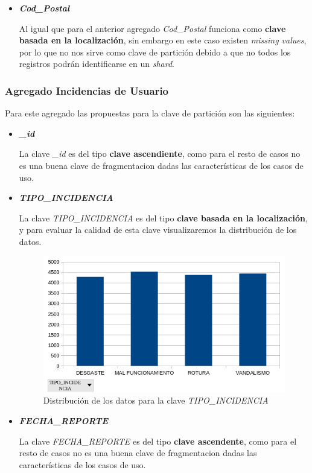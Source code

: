 \documentclass[]{article}
\begin{document}
\begin{itemize}
    \item \textbf{\textit{Cod\_Postal}}
    
    Al igual que para el anterior agregado \textit{Cod\_Postal} funciona como \textbf{clave basada en la localización}, sin embargo en este caso existen \textit{missing values}, por lo que no nos sirve como clave de partición debido a que no todos los registros podrán identificarse en un \textit{shard}.
\end{itemize}

\subsubsection{Agregado Incidencias de Usuario}
\label{subsubsec:fragmentacion_incidencia}

Para este agregado las propuestas para la clave de partición son las siguientes:

\begin{itemize}
    \item \textbf{\textit{\_id}}
    
    La clave \textit{\_id} es del tipo \textbf{clave ascendiente}, como para el resto de casos no es una buena clave de fragmentacion dadas las características de los casos de uso.

    \item \textbf{\textit{TIPO\_INCIDENCIA}}
    
    La clave \textit{TIPO\_INCIDENCIA} es del tipo \textbf{clave basada en la localización}, y para evaluar la calidad de esta clave visualizaremos la distribución de los datos.

    \begin{figure}[H]
        \includegraphics[width=0.90\linewidth]{Distribucion_Incidencias_TIPO_INCIDENCIA.png}
        \caption{Distribución de los datos para la clave \textit{TIPO\_INCIDENCIA}}
    \end{figure}

    \item \textbf{\textit{FECHA\_REPORTE}}
    
    La clave \textit{FECHA\_REPORTE} es del tipo \textbf{clave ascendente}, como para el resto de casos no es una buena clave de fragmentacion dadas las características de los casos de uso.

\end{itemize}
\end{document}

